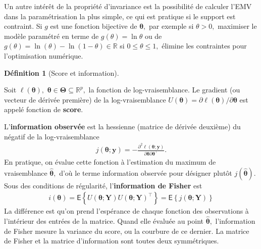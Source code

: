 \documentclass[
  11pt,
  letterpaper,
]{scrbook}
\theoremstyle{plain}
\theoremstyle{plain}
\theoremstyle{definition}
\theoremstyle{definition}
\newtheorem{definition}{Définition}[chapter]
\theoremstyle{remark}
\begin{document}
Un autre intérêt de la propriété d'invariance est la possibilité de
calculer l'EMV dans la paramétrisation la plus simple, ce qui est
pratique si le support est contraint. Si \(g\) est une fonction
bijective de \(\boldsymbol{\theta},\) par exemple si \(\theta >0,\)
maximiser le modèle paramétré en terme de \(g(\theta) = \ln \theta\) ou
de \(g(\theta) = \ln(\theta) - \ln(1-\theta) \in \mathbb{R}\) si
\(0 \leq \theta \leq 1,\) élimine les contraintes pour l'optimisation
numérique.

\begin{definition}[Score et
information]\protect\hypertarget{def-information}{}\label{def-information}

Soit \(\ell(\boldsymbol{\theta}),\)
\(\boldsymbol{\theta} \in \boldsymbol{\Theta} \subseteq \mathbb{R}^p,\)
la fonction de log-vraisemblance. Le gradient (ou vecteur de dérivée
première) de la log-vraisemblance
\(U(\boldsymbol{\theta}) = \partial \ell(\boldsymbol{\theta}) / \partial \boldsymbol{\theta}\)
est appelé fonction de \textbf{score}.

L'\textbf{information observée} est la hessienne (matrice de dérivée
deuxième) du négatif de la log-vraisemblance \begin{align*}
j(\boldsymbol{\theta}; \boldsymbol{y})=-\frac{\partial^2 \ell(\boldsymbol{\theta}; \boldsymbol{y})}{\partial \boldsymbol{\theta} \partial \boldsymbol{\theta}^\top}.
\end{align*} En pratique, on évalue cette fonction à l'estimation du
maximum de vraisemblance \(\widehat{\boldsymbol{\theta}},\) d'où le
terme information observée pour désigner plutôt
\(j(\widehat{\boldsymbol{\theta}}).\) Sous des conditions de régularité,
l'\textbf{information de Fisher} est \begin{align*}
i(\boldsymbol{\theta}) = \mathsf{E}\left\{U(\boldsymbol{\theta}; \boldsymbol{Y}) U(\boldsymbol{\theta}; \boldsymbol{Y})^\top\right\} = \mathsf{E}\left\{j(\boldsymbol{\theta}; \boldsymbol{Y})\right\}
\end{align*} La différence est qu'on prend l'espérance de chaque
fonction des observations à l'intérieur des entrées de la matrice. Quand
elle évaluée au point \(\widehat{\boldsymbol{\theta}},\) l'information
de Fisher mesure la variance du score, ou la courbure de ce dernier. La
matrice de Fisher et la matrice d'information sont toutes deux
symmétriques.

\end{definition}
\end{document}
